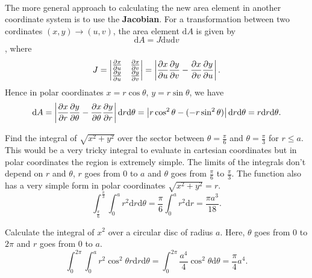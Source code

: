 \documentclass[../multivariate_calculus.tex]{subfiles}
\begin{document}
        \paragraph{}
        The more general approach to calculating the new area element in another coordinate system is to use the \textbf{Jacobian}.
        For a transformation between two cordinates $(x,y)\to(u,v)$, the area element $\mathrm{d}A$ is given by
        \begin{equation}
            \mathrm{d}A=J\mathrm{d}u\mathrm{d}v
        \end{equation},
        where
        \begin{equation}
            J=\begin{vmatrix}
                \pdv{x}{u} & \pdv{x}{v} \\
                \pdv{y}{u} & \pdv{y}{v}
            \end{vmatrix}=\left|\pdv{x}{u}\pdv{y}{v}-\pdv{x}{v}\pdv{y}{u}\right|.
        \end{equation}
        Hence in polar coordinates $x=r\cos\theta$, $y=r\sin\theta$, we have
        \begin{equation}
            \mathrm{d}A=\left|\pdv{x}{r}\pdv{y}{\theta}-\pdv{x}{\theta}\pdv{y}{r}\right|\mathrm{d}r\mathrm{d}\theta=\left|r\cos^2\theta-(-r\sin^2\theta)\right|\mathrm{d}r\mathrm{d}\theta=r\mathrm{d}r\mathrm{d}\theta.
        \end{equation}
        \begin{example}
            Find the integral of $\sqrt{x^2+y^2}$ over the sector between $\theta=\frac{\pi}{6}$ and $\theta=\frac{\pi}{3}$ for $r\leq a$.
            This would be a very tricky integral to evaluate in cartesian coordinates but in polar coordinates the region is extremely simple.
            The limits of the integrals don't depend on $r$ and $\theta$, $r$ goes from 0 to $a$ and $\theta$ goes from $\frac{\pi}{6}$ to $\frac{\pi}{3}$.
            The function also has a very simple form in polar coordinates $\sqrt{x^2+y^2}=r$.
            \begin{equation}
                \int_\frac{\pi}{6}^\frac{\pi}{3}\int_0^a r^2\mathrm{d}r\mathrm{d}\theta=\frac{\pi}{6}\int_0^a r^2\mathrm{d}r=\frac{\pi a^3}{18}.
            \end{equation}
        \end{example}
        \begin{example}
            Calculate the integral of $x^2$ over a circular disc of radius $a$.
            Here, $\theta$ goes from 0 to $2\pi$ and $r$ goes from 0 to $a$.
            \begin{equation}
                \int_0^{2\pi}\int_0^a r^2\cos^2\theta r\mathrm{d}r\mathrm{d}\theta=\int_0^{2\pi}\frac{a^4}{4}\cos^2\theta\mathrm{d}\theta=\frac{\pi}{4}a^4.
            \end{equation}
        \end{example}
\end{document}
